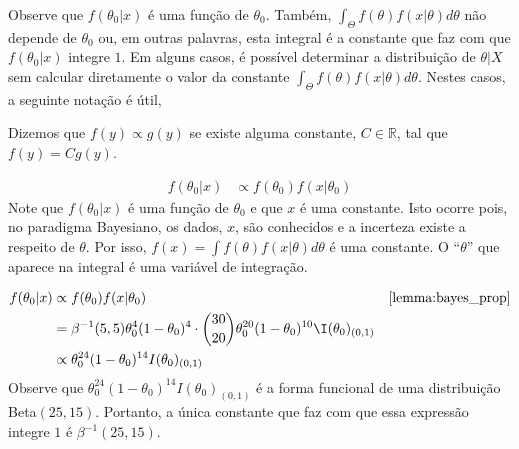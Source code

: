Observe que $f(\theta_{0}|x)$ é 
uma função de $\theta_{0}$.
Também, $\int_{\Theta}{f(\theta)f(x|\theta)d\theta}$ 
não depende de $\theta_{0}$ ou, em outras palavras, 
esta integral é a constante que faz com que
$f(\theta_{0}|x)$ integre $1$.
Em alguns casos, é possível determinar a 
distribuição de $\theta|X$ sem 
calcular diretamente o valor da constante 
$\int_{\Theta}{f(\theta)f(x|\theta)d\theta}$.
Nestes casos, a seguinte notação é útil,
\begin{definition}
 \label{prop}
 Dizemos que $f(y) \propto g(y)$
 se existe alguma constante, $C \in \mathbb{R}$, 
 tal que $f(y) = C g(y)$.
\end{definition} 

\begin{lemma}
 \label{lemma:bayes_prop}
 \begin{align*}
  f(\theta_{0}|x)
  &\propto f(\theta_{0})f(x|\theta_{0})
 \end{align*}
 Note que $f(\theta_{0}|x)$ é uma função de 
 $\theta_{0}$ e que $x$ é uma constante.
 Isto ocorre pois, no paradigma Bayesiano,
 os dados, $x$, são conhecidos e a incerteza existe 
 a respeito de $\theta$.
 Por isso, $f(x) = \int{f(\theta)f(x|\theta)d\theta}$ 
 é uma constante.
 O ``$\theta$'' que aparece na integral é 
 uma variável de integração.
\end{lemma}

\begin{example}
 \begin{align*}
  f(\theta_{0}|x)
  &\propto f(\theta_{0})f(x|\theta_{0})
  & \text{\Cref{lemma:bayes_prop}} \\
  &=\beta^{-1}(5,5)\theta_{0}^{4}(1-\theta_{0})^{4} \cdot {30 \choose 20}\theta_{0}^{20}(1-\theta_{0})^{10}\I(\theta_{0})_{(0,1)} \\
  &\propto \theta_{0}^{24}(1-\theta_{0})^{14}I(\theta_{0})_{(0,1)}
 \end{align*}
 Observe que $\theta_{0}^{24}(1-\theta_{0})^{14}I(\theta_{0})_{(0,1)}$ é
 a forma funcional de uma distribuição Beta$(25,15)$.
 Portanto, a única constante que faz com que
 essa expressão integre $1$
 é $\beta^{-1}(25,15)$.
\end{example}

